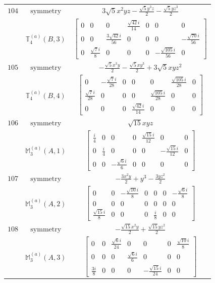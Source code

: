 \documentclass[fleqn,8pt,landscape]{jsarticle}
\begin{document}
\begin{longtable}{ccc}
$ 104 $ & $ \text{symmetry} $ & $ 3 \sqrt{5} x^{2} y z - \frac{\sqrt{5} y^{3} z}{2} - \frac{\sqrt{5} y z^{3}}{2} $ \\
$  $ & $ \mathbb{T}_{4}^{(a)}(B,3) $ & $ \begin{bmatrix} 0 & 0 & 0 & \frac{\sqrt{42} i}{14} & 0 & 0 & 0 \\ 0 & 0 & \frac{3 \sqrt{42} i}{56} & 0 & 0 & 0 & - \frac{\sqrt{70} i}{56} \\ 0 & \frac{\sqrt{7} i}{8} & 0 & 0 & 0 & - \frac{\sqrt{105} i}{56} & 0 \end{bmatrix} $ \\ \hline
$ 105 $ & $ \text{symmetry} $ & $ - \frac{\sqrt{5} x^{3} y}{2} - \frac{\sqrt{5} x y^{3}}{2} + 3 \sqrt{5} x y z^{2} $ \\
$  $ & $ \mathbb{T}_{4}^{(a)}(B,4) $ & $ \begin{bmatrix} 0 & - \frac{\sqrt{7} i}{28} & 0 & 0 & 0 & \frac{\sqrt{105} i}{28} & 0 \\ \frac{\sqrt{7} i}{28} & 0 & 0 & 0 & \frac{\sqrt{105} i}{28} & 0 & 0 \\ 0 & 0 & 0 & \frac{\sqrt{42} i}{14} & 0 & 0 & 0 \end{bmatrix} $ \\ \hline
$ 106 $ & $ \text{symmetry} $ & $ \sqrt{15} x y z $ \\
$  $ & $ \mathbb{M}_{3}^{(a)}(A,1) $ & $ \begin{bmatrix} \frac{i}{4} & 0 & 0 & 0 & \frac{\sqrt{15} i}{12} & 0 & 0 \\ 0 & \frac{i}{4} & 0 & 0 & 0 & - \frac{\sqrt{15} i}{12} & 0 \\ 0 & 0 & - \frac{\sqrt{6} i}{6} & 0 & 0 & 0 & 0 \end{bmatrix} $ \\ \hline
$ 107 $ & $ \text{symmetry} $ & $ - \frac{3 x^{2} y}{2} + y^{3} - \frac{3 y z^{2}}{2} $ \\
$  $ & $ \mathbb{M}_{3}^{(a)}(A,2) $ & $ \begin{bmatrix} 0 & 0 & - \frac{\sqrt{10} i}{8} & 0 & 0 & 0 & - \frac{\sqrt{6} i}{8} \\ 0 & 0 & 0 & 0 & 0 & 0 & 0 \\ \frac{\sqrt{15} i}{8} & 0 & 0 & 0 & \frac{i}{8} & 0 & 0 \end{bmatrix} $ \\ \hline
$ 108 $ & $ \text{symmetry} $ & $ - \frac{\sqrt{15} x^{2} y}{2} + \frac{\sqrt{15} y z^{2}}{2} $ \\
$  $ & $ \mathbb{M}_{3}^{(a)}(A,3) $ & $ \begin{bmatrix} 0 & 0 & \frac{\sqrt{6} i}{24} & 0 & 0 & 0 & \frac{\sqrt{10} i}{8} \\ 0 & 0 & 0 & \frac{\sqrt{6} i}{6} & 0 & 0 & 0 \\ \frac{3 i}{8} & 0 & 0 & 0 & - \frac{\sqrt{15} i}{24} & 0 & 0 \end{bmatrix} $ \\ \hline

\end{longtable}
\end{document}
